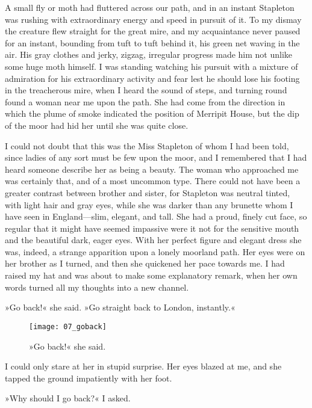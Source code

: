 A small fly or moth had fluttered across our path, and in an instant Stapleton was rushing with extraordinary energy and speed in pursuit of it. To my dismay the creature flew straight for the great mire, and my acquaintance never paused for an instant, bounding from tuft to tuft behind it, his green net waving in the air. His gray clothes and jerky, zigzag, irregular progress made him not unlike some huge moth himself. I was standing watching his pursuit with a mixture of admiration for his extraordinary activity and fear lest he should lose his footing in the treacherous mire, when I heard the sound of steps, and turning round found a woman near me upon the path. She had come from the direction in which the plume of smoke indicated the position of Merripit House, but the dip of the moor had hid her until she was quite close.

I could not doubt that this was the Miss Stapleton of whom I had been told, since ladies of any sort must be few upon the moor, and I remembered that I had heard someone describe her as being a beauty. The woman who approached me was certainly that, and of a most uncommon type. There could not have been a greater contrast between brother and sister, for Stapleton was neutral tinted, with light hair and gray eyes, while she was darker than any brunette whom I have seen in England—slim, elegant, and tall. She had a proud, finely cut face, so regular that it might have seemed impassive were it not for the sensitive mouth and the beautiful dark, eager eyes. With her perfect figure and elegant dress she was, indeed, a strange apparition upon a lonely moorland path. Her eyes were on her brother as I turned, and then she quickened her pace towards me. I had raised my hat and was about to make some explanatory remark, when her own words turned all my thoughts into a new channel.

»Go back!« she said. »Go straight back to London, instantly.«

\makeatletter
{}
{%
	\begin{figure}[tbhp]
	\centering
	\texttt{[image: 07\_goback]}
	\caption{»Go back!« she said.}
	\end{figure}
}{%

}
\makeatother



I could only stare at her in stupid surprise. Her eyes blazed at me, and she tapped the ground impatiently with her foot.

»Why should I go back?« I asked.

